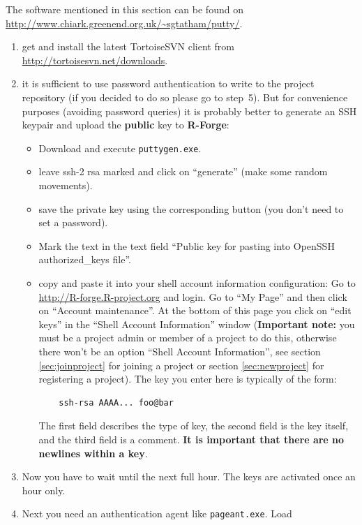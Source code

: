 \documentclass[a4paper]{article}
\begin{document}
The software mentioned in this section can be found
on\newline
\url{http://www.chiark.greenend.org.uk/~sgtatham/putty/}.
\begin{enumerate}
\item get and install the latest TortoiseSVN client from
  \url{http://tortoisesvn.net/downloads}.
\item it is sufficient to use password authentication to write to the
  project repository (if you decided to do so please go to
  step~5). But for convenience purposes (avoiding password 
  queries) it is probably better to
  generate an SSH keypair and upload the \textbf{public} 
  key to \textbf{R-Forge}:
  \begin{itemize}
  \item Download and execute \texttt{puttygen.exe}.
  \item leave ssh-2 rsa marked and click on ``generate'' (make some
    random movements).
  \item save the private key using the corresponding button (you don't
    need to set a password).
  \item  Mark the text in the text field ``Public key
    for pasting into OpenSSH authorized\_keys file''.
  \item copy and paste it into your shell account information
    configuration: Go to \url{http://R-forge.R-project.org} and
    login. Go to ``My Page'' and then click on ``Account
    maintenance''. At the bottom 
    of this page you click on ``edit keys'' in the ``Shell Account
    Information'' window (\textbf{Important note:} you must be a project admin
    or member of a project to do this, otherwise there won't be an
    option ``Shell Account Information'', see section
    \ref{sec:joinproject} for joining a project or section
    \ref{sec:newproject} for registering a project).
    The key you enter here is typically of the form:
    \begin{verbatim}
    ssh-rsa AAAA... foo@bar
    \end{verbatim}
    The first field
    describes the type of key, the second field is the key itself, and
    the third field is a comment. \textbf{It is important that there are no
      newlines within a key}.
  \end{itemize}
\item Now you have to wait until the next full hour. The keys are
  activated once an hour only.
\item Next you need an authentication agent like \texttt{pageant.exe}. Load

\end{enumerate}
\end{document}
